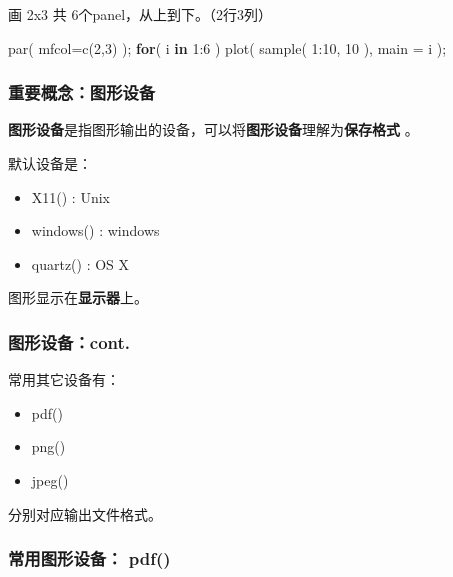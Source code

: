 \documentclass[
]{article}
\newenvironment{Shaded}{}{}
\newcommand{\AttributeTok}[1]{\textcolor[rgb]{0.49,0.56,0.16}{#1}}
\newcommand{\ControlFlowTok}[1]{\textcolor[rgb]{0.00,0.44,0.13}{\textbf{#1}}}
\newcommand{\DecValTok}[1]{\textcolor[rgb]{0.25,0.63,0.44}{#1}}
\newcommand{\FunctionTok}[1]{\textcolor[rgb]{0.02,0.16,0.49}{#1}}
\newcommand{\NormalTok}[1]{#1}
\newcommand{\SpecialCharTok}[1]{\textcolor[rgb]{0.25,0.44,0.63}{#1}}
\begin{document}
画 2x3 共 6个panel，从上到下。（2行3列）

\begin{Shaded}
\begin{Highlighting}[]
\FunctionTok{par}\NormalTok{( }\AttributeTok{mfcol=}\FunctionTok{c}\NormalTok{(}\DecValTok{2}\NormalTok{,}\DecValTok{3}\NormalTok{) );}
\ControlFlowTok{for}\NormalTok{( i }\ControlFlowTok{in} \DecValTok{1}\SpecialCharTok{:}\DecValTok{6}\NormalTok{ )}
  \FunctionTok{plot}\NormalTok{( }\FunctionTok{sample}\NormalTok{( }\DecValTok{1}\SpecialCharTok{:}\DecValTok{10}\NormalTok{, }\DecValTok{10}\NormalTok{ ), }\AttributeTok{main =}\NormalTok{ i );}
\end{Highlighting}
\end{Shaded}

\hypertarget{ux91cdux8981ux6982ux5ff5ux56feux5f62ux8bbeux5907}{%
\subsubsection{重要概念：图形设备}\label{ux91cdux8981ux6982ux5ff5ux56feux5f62ux8bbeux5907}}

\textbf{图形设备}是指图形输出的设备，可以将\textbf{图形设备}理解为\textbf{保存格式}
。

默认设备是：

\begin{itemize}
\item
  X11() : Unix
\item
  windows() : windows
\item
  quartz() : OS X
\end{itemize}

图形显示在\textbf{显示器}上。

\hypertarget{ux56feux5f62ux8bbeux5907cont}{%
\subsubsection{\texorpdfstring{图形设备：cont.
}{图形设备：cont. }}\label{ux56feux5f62ux8bbeux5907cont}}

常用其它设备有：

\begin{itemize}
\item
  pdf()
\item
  png()
\item
  jpeg()
\end{itemize}

分别对应输出文件格式。

\hypertarget{ux5e38ux7528ux56feux5f62ux8bbeux5907-pdf}{%
\subsubsection{\texorpdfstring{常用图形设备： pdf()
}{常用图形设备： pdf() }}\label{ux5e38ux7528ux56feux5f62ux8bbeux5907-pdf}}
\end{document}
